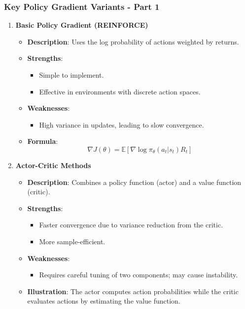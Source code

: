 \documentclass{beamer}
\begin{document}
\begin{frame}[fragile]
    \frametitle{Key Policy Gradient Variants - Part 1}
    \begin{enumerate}
        \item \textbf{Basic Policy Gradient (REINFORCE)}
        \begin{itemize}
            \item \textbf{Description}: Uses the log probability of actions weighted by returns.
            \item \textbf{Strengths}: 
            \begin{itemize}
                \item Simple to implement.
                \item Effective in environments with discrete action spaces.
            \end{itemize}
            \item \textbf{Weaknesses}: 
            \begin{itemize}
                \item High variance in updates, leading to slow convergence.
            \end{itemize}
            \item \textbf{Formula}:
            \begin{equation}
                \nabla J(\theta) = \mathbb{E}[\nabla \log \pi_\theta(a_t | s_t) R_t]
            \end{equation}
        \end{itemize}

        \item \textbf{Actor-Critic Methods}
        \begin{itemize}
            \item \textbf{Description}: Combines a policy function (actor) and a value function (critic).
            \item \textbf{Strengths}: 
            \begin{itemize}
                \item Faster convergence due to variance reduction from the critic.
                \item More sample-efficient.
            \end{itemize}
            \item \textbf{Weaknesses}: 
            \begin{itemize}
                \item Requires careful tuning of two components; may cause instability.
            \end{itemize}
            \item \textbf{Illustration}: The actor computes action probabilities while the critic evaluates actions by estimating the value function.
        \end{itemize}
    \end{enumerate}
\end{frame}
\end{document}
